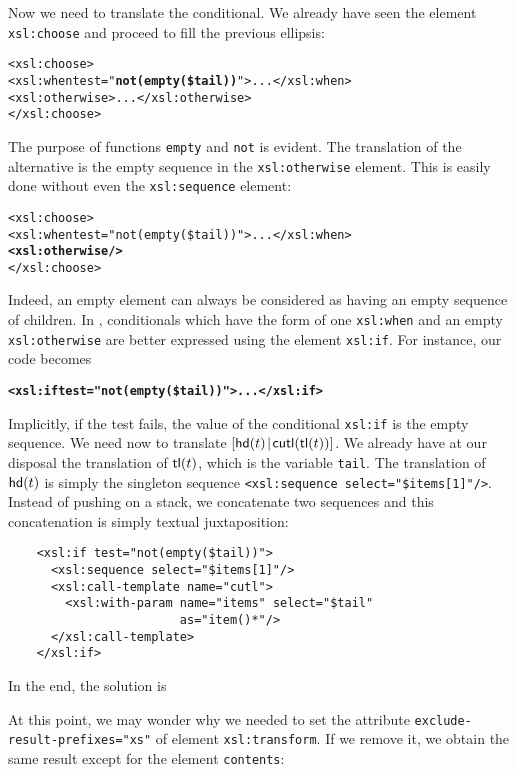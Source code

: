 Now we need to translate the conditional. We already have
seen the element \texttt{xsl:choose} and proceed to fill the previous ellipsis:
\begin{alltt}
    <xsl:choose>
      <xsl:when test="\textbf{not(empty(\$tail))}"> ... </xsl:when>
      <xsl:otherwise> ... </xsl:otherwise>
    </xsl:choose>
\end{alltt}
The purpose of \XPath functions \texttt{empty} and \texttt{not} is
evident. The translation of the  alternative is the empty
sequence in the \texttt{xsl:otherwise} element. This is easily done
without even the \texttt{xsl:sequence} element:
\begin{alltt}
    <xsl:choose>
      <xsl:when test="not(empty(\$tail))"> ... </xsl:when>
      \textbf{<xsl:otherwise/>}
    </xsl:choose>
\end{alltt}
Indeed, an empty element can always be considered as having an empty
sequence of children. In \XSLT, conditionals which have the form of
one \texttt{xsl:when} and an empty \texttt{xsl:otherwise} are better
expressed using the element \texttt{xsl:if}. For instance, our code
becomes
\begin{alltt}
    \textbf{<xsl:if test="not(empty(\$tail))"> ... </xsl:if>}
\end{alltt}
Implicitly, if the test fails, the value of the conditional
\texttt{xsl:if} is the empty sequence. We need now to translate
\([{\textsf{hd}(t)}\!\mid\!{\textsf{cutl}(\textsf{tl}(t))}]\). 
 We already have at our disposal the
translation of \(\textsf{tl}(t)\), which is the \XSLT variable
\texttt{tail}. The translation of \(\textsf{hd}(t)\) is simply the
singleton sequence \texttt{<xsl:sequence
  select="\$items[1]"/>}. Instead of pushing on a stack, we concatenate
two sequences and this concatenation is simply textual juxtaposition:
\begin{verbatim}
    <xsl:if test="not(empty($tail))">
      <xsl:sequence select="$items[1]"/>
      <xsl:call-template name="cutl">
        <xsl:with-param name="items" select="$tail"
                        as="item()*"/>
      </xsl:call-template>
    </xsl:if>
\end{verbatim}
In the end, the solution is

At this point, we may wonder why we needed to set the attribute
\texttt{exclude-result-prefixes="xs"} of element
\texttt{xsl:transform}. If we remove it, we obtain the same result
except for the element \texttt{contents}:


